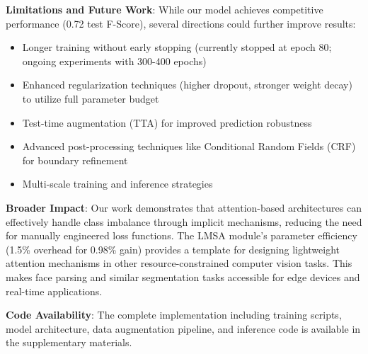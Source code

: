 \textbf{Limitations and Future Work}:
While our model achieves competitive performance (0.72 test F-Score), several directions could further improve results:
\begin{itemize}
    \item Longer training without early stopping (currently stopped at epoch 80; ongoing experiments with 300-400 epochs)
    \item Enhanced regularization techniques (higher dropout, stronger weight decay) to utilize full parameter budget
    \item Test-time augmentation (TTA) for improved prediction robustness
    \item Advanced post-processing techniques like Conditional Random Fields (CRF) for boundary refinement
    \item Multi-scale training and inference strategies
\end{itemize}

\textbf{Broader Impact}: Our work demonstrates that attention-based architectures can effectively handle class imbalance through implicit mechanisms, reducing the need for manually engineered loss functions. The LMSA module's parameter efficiency (1.5\% overhead for 0.98\% gain) provides a template for designing lightweight attention mechanisms in other resource-constrained computer vision tasks. This makes face parsing and similar segmentation tasks accessible for edge devices and real-time applications.

\textbf{Code Availability}: The complete implementation including training scripts, model architecture, data augmentation pipeline, and inference code is available in the supplementary materials.
